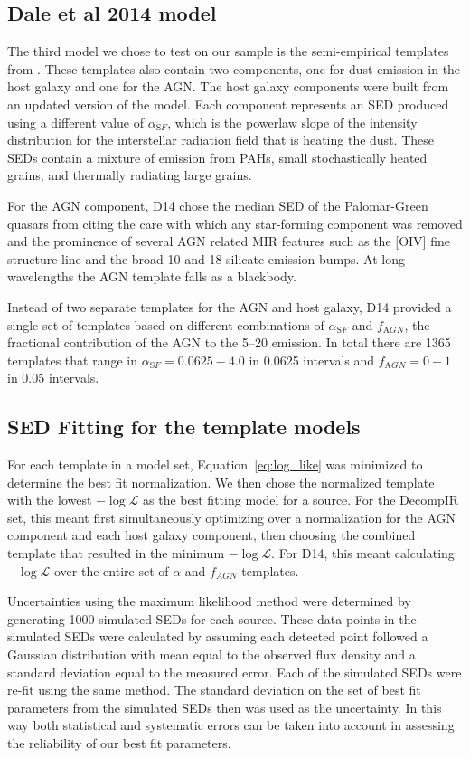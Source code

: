 \documentclass[fleqn, usenatbib]{mnras}
\begin{document}
\subsection{Dale et al 2014 model}
The third model we chose to test on our sample is the semi-empirical templates from \citet[][hereafter D14]{Dale:2014yq}. These templates also contain two components, one for dust emission in the host galaxy and one for the AGN. The host galaxy components were built from an updated version of the \citet{Dale:2002ty} model. Each component represents an SED produced using a different value of $\alpha_{\mathrm SF}$, which is the powerlaw slope of the intensity distribution for the interstellar radiation field that is heating the dust. These SEDs contain a mixture of emission from PAHs, small stochastically heated grains, and thermally radiating large grains.

For the AGN component, D14 chose the median SED of the Palomar-Green quasars from \citet{Shi:2013vn} citing the care with which any star-forming component was removed and the prominence of several AGN related MIR features such as the [OIV] fine structure line and the broad 10 and 18 \micron{} silicate emission bumps. At long wavelengths the AGN template falls as a blackbody.

Instead of two separate templates for the AGN and host galaxy, D14 provided a single set of templates based on different combinations of $\alpha_{\mathrm SF}$ and $f_{\mathrm AGN}$, the fractional contribution of the AGN to the 5--20 \micron{} emission. In total there are 1365 templates that range in $\alpha_{\mathrm SF}=0.0625-4.0$ in 0.0625 intervals and $f_{\mathrm AGN} = 0-1$ in 0.05 intervals.

\subsection{SED Fitting for the template models}
For each template in a model set, Equation~\ref{eq:log_like} was minimized to determine the best fit normalization. We then chose the normalized template with the lowest $-\log\mathcal{L}$ as the best fitting model for a source. For the DecompIR set, this meant first simultaneously optimizing over a normalization for the AGN component and each host galaxy component, then choosing the combined template that resulted in the minimum $-\log\mathcal{L}$. For D14, this meant calculating $-\log\mathcal{L}$ over the entire set of $\alpha$ and $f_{AGN}$ templates.

Uncertainties using the maximum likelihood method were determined by generating 1000 simulated SEDs for each source. These data points in the simulated SEDs were calculated by assuming each detected point followed a Gaussian distribution with mean equal to the observed flux density and a standard deviation equal to the measured error. Each of the simulated SEDs were re-fit using the same method. The standard deviation on the set of best fit parameters from the simulated SEDs then was used as the uncertainty. In this way both statistical and systematic errors can be taken into account in assessing the reliability of our best fit parameters. 
\end{document}

